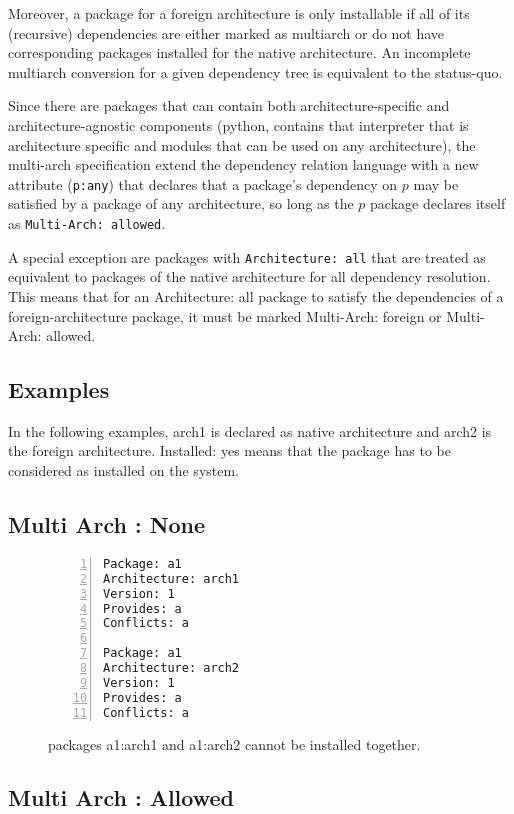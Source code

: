 Moreover, a package for a foreign architecture is only installable if
all of its (recursive) dependencies are either marked as multiarch or
do not have corresponding packages installed for the native
architecture. An incomplete multiarch conversion for a given
dependency tree is equivalent to the status-quo. 

Since there are packages that can contain both architecture-specific
and architecture-agnostic components (python, contains that
interpreter that is architecture specific and modules that can be used
on any architecture), the multi-arch specification extend the
dependency relation language with a new attribute (\texttt{p:any})
that declares that a package's dependency on $p$ may be satisfied by a
package of any architecture, so long as the $p$ package declares
itself as \texttt{Multi-Arch: allowed}. 

A special exception are packages with \texttt{Architecture: all} that
are treated as equivalent to packages of the native architecture for
all dependency resolution. This means that for an Architecture: all
package to satisfy the dependencies of a foreign-architecture package,
it must be marked Multi-Arch: foreign or Multi-Arch: allowed. 

\subsection{Examples}

In the following examples, arch1 is declared as native architecture and arch2
is the foreign architecture. Installed: yes means that the package has
to be considered as installed on the system.

\subsection{Multi Arch : None}

\begin{figure}
\begin{lstlisting}[style=debctrl,numbers=left,xleftmargin=20pt,basicstyle=\footnotesize\normalfont\ttfamily]
Package: a1
Architecture: arch1
Version: 1
Provides: a
Conflicts: a

Package: a1
Architecture: arch2
Version: 1
Provides: a
Conflicts: a
\end{lstlisting}
\caption{packages a1:arch1 and a1:arch2 cannot be installed together.}
\label{fig:arch-none}
\end{figure}

\subsection{Multi Arch : Allowed}

